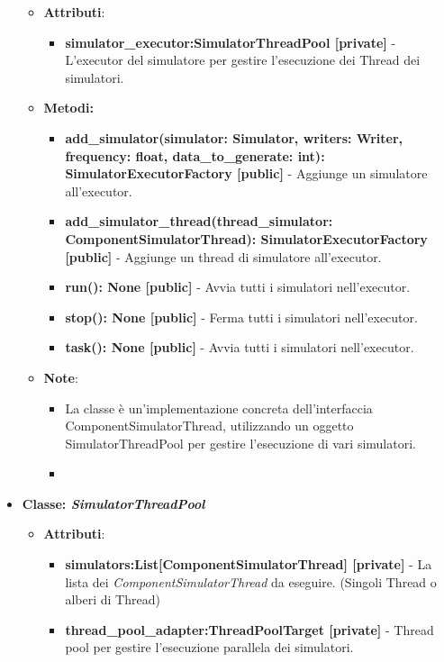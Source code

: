 \begin{itemize}
    \begin{itemize}
        \item\textbf{Attributi}:
        \begin{itemize}
            \item \textbf{simulator\_executor:SimulatorThreadPool [private]} - L'executor del simulatore per gestire l'esecuzione dei Thread dei simulatori.
        \end{itemize}
        \item \textbf{Metodi: }
        \begin{itemize}
            \item \textbf{add\_simulator(simulator: Simulator, writers: Writer, frequency: float, data\_to\_generate: int): SimulatorExecutorFactory [public]} - Aggiunge un simulatore all'executor.
            \item \textbf{add\_simulator\_thread(thread\_simulator: ComponentSimulatorThread): SimulatorExecutorFactory [public]} - Aggiunge un thread di simulatore all'executor.
            \item \textbf{run(): None [public]} - Avvia tutti i simulatori nell'executor.
            \item \textbf{stop(): None [public]} - Ferma tutti i simulatori nell'executor.
            \item \textbf{task(): None [public]} - Avvia tutti i simulatori nell'executor.
        \end{itemize}
        \item\textbf{Note}:
        \begin{itemize}
            \item La classe è un'implementazione concreta dell'interfaccia ComponentSimulatorThread, utilizzando un oggetto SimulatorThreadPool per gestire l'esecuzione di vari simulatori.
            \item 
        \end{itemize}
    \end{itemize}
    \item{\textbf{Classe: \textit{SimulatorThreadPool}}}
    \begin{itemize}
        \item\textbf{Attributi}:
        \begin{itemize}
            \item \textbf{simulators:List[ComponentSimulatorThread] [private]} - La lista dei \textit{ComponentSimulatorThread} da eseguire. (Singoli Thread o alberi di Thread)
            \item \textbf{thread\_pool\_adapter:ThreadPoolTarget [private]} - Thread pool per gestire l'esecuzione parallela dei simulatori.

\end{itemize}
\end{itemize}
\end{itemize}
